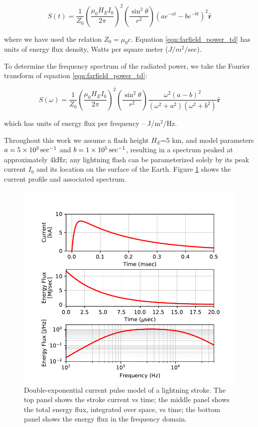 \begin{equation}
\label{eqn:farfield_power_td}
S(t) = \frac{1}{Z_0}\left(\frac{\mu_0 H_E I_0}{2 \pi}\right)^2\left(\frac{\sin^2\theta}{r^2}\right) \left(a e^{-a t} - b e^{-b t}\right)^2  \mathbf{\hat{r}}
\end{equation}

where we have used the relation $Z_0 = \mu_0 c$. Equation \ref{eqn:farfield_power_td} has units of energy flux density, Watts per square meter ($J/m^2/$sec).

To determine the frequency spectrum of the radiated power, we take the Fourier transform of equation \ref{eqn:farfield_power_td}:

\begin{equation}
\label{eqn:farfield_power_fd}
S(\omega) = \frac{1}{Z_0}\left(\frac{\mu_0 H_E I_0}{2 \pi}\right)^2\left(\frac{\sin^2\theta}{r^2}\right) \frac{\omega^2(a-b)^2}{(\omega^2 + a^2)(\omega^2 + b^2)}  \mathbf{\hat{r}}
\end{equation}

which has units of energy flux per frequency -- J/m$^2$/Hz.

Throughout this work we assume a flash height $H_E$=5 km, and model parameters $a=5\times 10^{3}\,\mathrm{sec}^{-1}$ and $b=1\times 10^{5}\,\mathrm{sec}^{-1}$, resulting in a spectrum peaked at approximately 4kHz; any lightning flash can be parameterized solely by its peak current $I_0$ and its location on the surface of the Earth. Figure \ref{fig:lightning_spectrum} shows the current profile and associated spectrum.

\begin{figure}[h]
\begin{center}
\includegraphics{figures/Lightning_spectra.pdf}

\caption{Double-exponential current pulse model of a lightning stroke. The top panel shows the stroke current vs time; the middle panel shows the total energy flux, integrated over space, vs time; the bottom panel shows the energy flux in the frequency domain.}
\label{fig:lightning_spectrum}
\end{center}
\end{figure}

